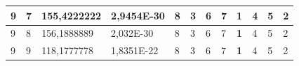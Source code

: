 \documentclass[conference]{IEEEtran}
\begin{document}
\begin{table}[]
\begin{tabular}{|llll|llllllll|}
\multicolumn{1}{|l|}{9}                                                              & \multicolumn{1}{l|}{7}                                                                 & \multicolumn{1}{l|}{155,4222222}                                                           & 2,9454E-30                              & \multicolumn{1}{l|}{8}                                                           & \multicolumn{1}{l|}{3}                                                           & \multicolumn{1}{l|}{6}                                                           & \multicolumn{1}{l|}{7}                                                           & \multicolumn{1}{l|}{\textbf{1}}                                                  & \multicolumn{1}{l|}{4}                                                           & \multicolumn{1}{l|}{5}                                                           & 2                                   \\ \hline
\multicolumn{1}{|l|}{9}                                                              & \multicolumn{1}{l|}{8}                                                                 & \multicolumn{1}{l|}{156,1888889}                                                           & 2,032E-30                               & \multicolumn{1}{l|}{8}                                                           & \multicolumn{1}{l|}{3}                                                           & \multicolumn{1}{l|}{6}                                                           & \multicolumn{1}{l|}{7}                                                           & \multicolumn{1}{l|}{\textbf{1}}                                                  & \multicolumn{1}{l|}{4}                                                           & \multicolumn{1}{l|}{5}                                                           & 2                                   \\ \hline
\multicolumn{1}{|l|}{9}                                                              & \multicolumn{1}{l|}{9}                                                                 & \multicolumn{1}{l|}{118,1777778}                                                           & 1,8351E-22                              & \multicolumn{1}{l|}{8}                                                           & \multicolumn{1}{l|}{3}                                                           & \multicolumn{1}{l|}{6}                                                           & \multicolumn{1}{l|}{7}                                                           & \multicolumn{1}{l|}{\textbf{1}}                                                  & \multicolumn{1}{l|}{4}                                                           & \multicolumn{1}{l|}{5}                                                           & 2                                   \\ \hline

\end{tabular}
\end{table}
\end{document}
